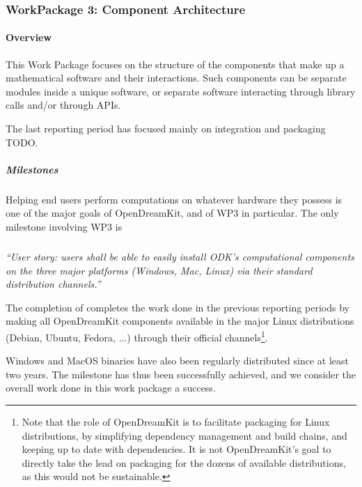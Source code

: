 \subsubsection{WorkPackage 3:  Component Architecture}

\paragraph{Overview}

This Work Package focuses on the structure of the components that make
up a mathematical software and their interactions. Such components can
be separate modules inside a unique software, or separate software
interacting through library calls and/or through APIs.

The last reporting period has focused mainly on integration and packaging TODO.

\subparagraph{Milestones} Helping end users perform computations on
whatever hardware they possess is one of the major goals of
OpenDreamKit, and of WP3 in particular. The only milestone involving
WP3 is

\subparagraph{}

\emph{“User story: users shall be able to easily install ODK's
    computational components on the three major platforms (Windows,
    Mac, Linux) via their standard distribution channels.”}

  The completion of
   completes
  the work done in the previous reporting periods by making all
  OpenDreamKit components available in the major Linux distributions
  (Debian, Ubuntu, Fedora, ...) through their official
  channels\footnote{Note that the role of OpenDreamKit is to
    facilitate packaging for Linux distributions, by simplifying
    dependency management and build chains, and keeping up to date
    with dependencies. It is not OpenDreamKit's goal to directly take
    the lead on packaging for the dozens of available distributions,
    as this would not be sustainable.}.

  Windows and MacOS binaries have also been regularly distributed
  since at least two years. The milestone has thus been successfully
  achieved, and we consider the overall work done in this work package
  a success.
  
